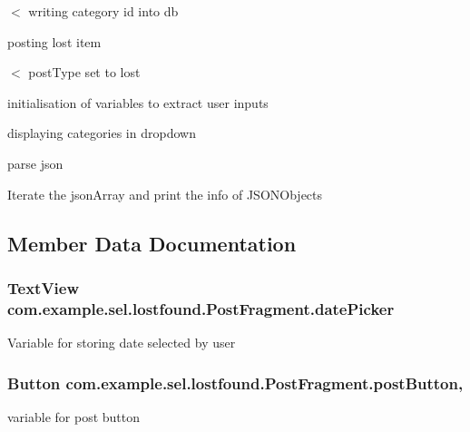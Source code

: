 \begin{DoxyCompactItemize}
$<$ writing category id into db

posting lost item

$<$ post\-Type set to lost

initialisation of variables to extract user inputs

displaying categories in dropdown

parse json

Iterate the json\-Array and print the info of J\-S\-O\-N\-Objects 

\subsection{Member Data Documentation}
\hypertarget{classcom_1_1example_1_1sel_1_1lostfound_1_1PostFragment_a1c187b07da5262cf568439018a826ef9}{
\subsubsection[{date\-Picker}]{\setlength{\rightskip}{0pt plus 5cm}Text\-View com.\-example.\-sel.\-lostfound.\-Post\-Fragment.\-date\-Picker\hspace{0.3cm}{\ttfamily [static]}}}\label{classcom_1_1example_1_1sel_1_1lostfound_1_1PostFragment_a1c187b07da5262cf568439018a826ef9}
Variable for storing date selected by user \hypertarget{classcom_1_1example_1_1sel_1_1lostfound_1_1PostFragment_ab2d93225b515c22ccd209e1382e1a4a1}{
\subsubsection[{post\-Button}]{\setlength{\rightskip}{0pt plus 5cm}Button com.\-example.\-sel.\-lostfound.\-Post\-Fragment.\-post\-Button\hspace{0.3cm}{\ttfamily [static]}, {\ttfamily [protected]}}}\label{classcom_1_1example_1_1sel_1_1lostfound_1_1PostFragment_ab2d93225b515c22ccd209e1382e1a4a1}
variable for post button \hypertarget{classcom_1_1example_1_1sel_1_1lostfound_1_1PostFragment_ac6d98a5b689bea76cf1248a20a54d23c}{
}
\end{DoxyCompactItemize}

